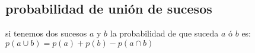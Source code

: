 \subsection{probabilidad de unión de sucesos}
si tenemos dos sucesos $a$ y $b$ la probabilidad de que suceda $a$ ó $b$ es:
$p(a\cup b)=p(a)+p(b)-p(a\cap b)$
